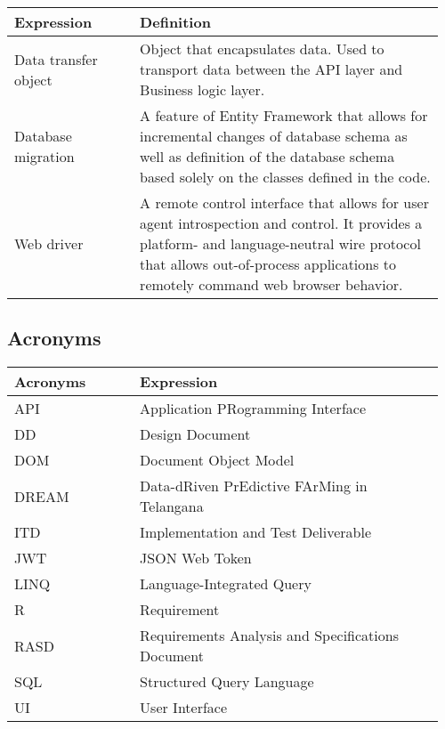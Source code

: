\begin{center}
    \begin{longtable}{@{}p{0.28\linewidth} p{0.68\linewidth}@{}}
		\toprule
		\textbf{Expression}     & \textbf{Definition}\\
		
		\midrule
        Data transfer object & Object that encapsulates data. Used to transport data between the API layer and Business logic layer. \\
        Database migration & A feature of Entity Framework that allows for incremental changes of database schema as well as definition of the database schema based solely on the classes defined in the code. \\
        Web driver & A remote control interface that allows for user agent introspection and control. It provides a platform- and language-neutral wire protocol that allows out-of-process applications to remotely command web browser behavior.\\
	\bottomrule
	\end{longtable}
\end{center}

\subsection{Acronyms}

\begin{center}
	\begin{longtable}{@{}p{0.28\linewidth} p{0.68\linewidth}@{}}
		\toprule
		\textbf{Acronyms}   & \textbf{Expression}\\
		\endfirsthead
		\midrule
		API                 & Application PRogramming Interface\\
		DD                  & Design Document\\
		DOM                 & Document Object Model\\
		DREAM               & Data-dRiven PrEdictive FArMing in Telangana\\
		ITD					& Implementation and Test Deliverable\\
		JWT                 & JSON Web Token\\
		LINQ                & Language-Integrated Query\\
		R                   & Requirement\\
		RASD                & Requirements Analysis and Specifications Document\\
		SQL                 & Structured Query Language\\
		UI                  & User Interface\\
		\bottomrule
	\end{longtable}
\end{center}

